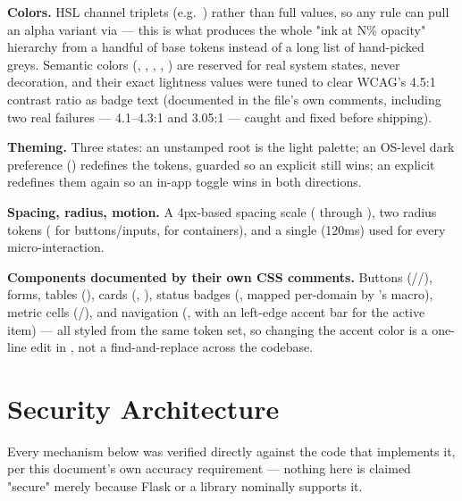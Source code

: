 \textbf{Colors.} HSL channel triplets (e.g.\ )
rather than full  values, so any rule can pull an alpha
variant via  --- this is what produces the
whole "ink at N\% opacity" hierarchy from a handful of base tokens
instead of a long list of hand-picked greys. Semantic colors
(, , , ,
) are reserved for real system states, never decoration,
and their exact lightness values were tuned to clear WCAG's 4.5:1
contrast ratio as badge text (documented in the file's own comments,
including two real failures --- 4.1--4.3:1 and 3.05:1 --- caught and
fixed before shipping).

\textbf{Theming.} Three states: an unstamped root is the light palette;
an OS-level dark preference ()
redefines the tokens, guarded so an explicit 
still wins; an explicit  redefines them again so
an in-app toggle wins in both directions.

\textbf{Spacing, radius, motion.} A 4px-based spacing scale
( through ), two radius tokens
( for buttons/inputs,  for
containers), and a single  (120ms) used for
every micro-interaction.

\textbf{Components documented by their own CSS comments.} Buttons
(\allowbreak/\allowbreak/),
forms, tables (), cards (,
), status badges (, mapped
per-domain by 's macro), metric cells
(\allowbreak/), and navigation
(, with an  left-edge accent bar for the
active item) --- all styled from the same token set, so changing the
accent color is a one-line edit in , not a
find-and-replace across the codebase.

\section{Security Architecture}

Every mechanism below was verified directly against the code that
implements it, per this document's own accuracy requirement --- nothing
here is claimed "secure" merely because Flask or a library nominally
supports it.

